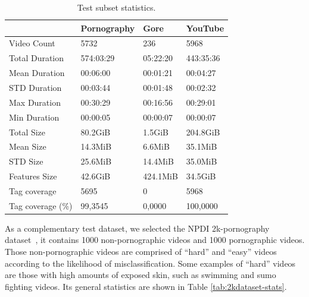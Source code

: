\begin{table}
\centering
\caption{Test subset statistics.}
\begin{tabular}{l|l|l|l}
                  & Pornography & Gore     & YouTube   \\ \hline
Video Count       & 5732        & 236      & 5968      \\ \hline
Total Duration    & 574:03:29   & 05:22:20 & 443:35:36 \\ \hline
Mean Duration     & 00:06:00    & 00:01:21 & 00:04:27  \\ \hline
STD Duration      & 00:03:44    & 00:01:48 & 00:02:32  \\ \hline
Max Duration      & 00:30:29    & 00:16:56 & 00:29:01  \\ \hline
Min Duration      & 00:00:05    & 00:00:07 & 00:00:07  \\ \hline
Total Size        & 80.2GiB     & 1.5GiB   & 204.8GiB  \\ \hline
Mean Size         & 14.3MiB     & 6.6MiB   & 35.1MiB   \\ \hline
STD Size          & 25.6MiB     & 14.4MiB  & 35.0MiB   \\ \hline
Features Size     & 42.6GiB     & 424.1MiB & 34.5GiB   \\ \hline
Tag coverage      & 5695        & 0        & 5968      \\ \hline
Tag coverage (\%) & 99,3545     & 0,0000   & 100,0000 
\end{tabular}
\label{tab:subset-stats}
\end{table}

As a complementary test dataset, we selected the NPDI 2k-pornography dataset~\cite{avila2013pooling}, it contains 1000 non-pornographic videos and 1000 pornographic videos. Those non-pornographic videos are comprised of ``hard'' and ``easy'' videos according to the likelihood of misclassification. Some examples of ``hard'' videos are those with high amounts of exposed skin, such as swimming and sumo fighting videos. Its general statistics are shown in Table \ref{tab:2kdataset-stats}.

